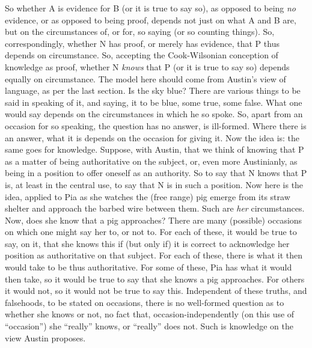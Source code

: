 So whether A is evidence for B (or it is true to say so), as opposed to being \emph{no} evidence, or as opposed to being proof, depends not just on what A and B are, but on the circumstances of, or for, so saying (or so counting things). So, correspondingly, whether N has proof, or merely has evidence, that P thus depends on circumstance. So, accepting the Cook-Wilsonian conception of knowledge as proof, whether N \emph{knows} that P (or it is true to say so) depends equally on circumstance. The model here should come from Austin's view of language, as per the last section. Is the sky blue? There are various things to be said in speaking of it, and saying, it to be blue, some true, some false. What one would say depends on the circumstances in which he so spoke. So, apart from an occasion for so speaking, the question has no answer, is ill-formed. Where there  is an answer, what it is depends on the occasion for giving it. Now the idea is: the same goes for knowledge. Suppose, with Austin, that we think of knowing that P as a matter of being authoritative on the subject, or, even more Austinianly, as being in a position to offer oneself as an authority. So to say that N knows that P is, at least in the central use, to say that N is in such a position. Now here is the idea, applied to Pia as she watches the (free range) pig emerge from its straw shelter and approach the barbed wire between them. Such are \emph{her} circumstances. Now, does she know that a pig approaches? There are many (possible) occasions on which one might say her to, or not to. For each of these, it would be true to say, on it, that she knows this if (but only if) it is correct to acknowledge her position as authoritative on that subject. For each of these, there is what it then would take to be thus authoritative. For some of these, Pia has what it would then take, so it would be true to say that she knows a pig approaches. For others it would not, so it would not be true to say this. Independent of these truths, and falsehoods, to be stated on occasions, there is no well-formed question as to whether she knows or not, no fact that, occasion-independently (on this use of ``occasion'') she ``really'' knows, or ``really'' does not. Such is knowledge on the view Austin proposes.

